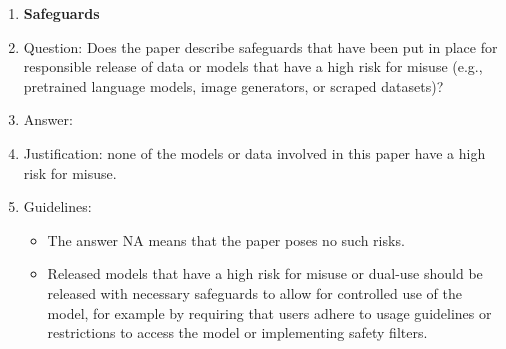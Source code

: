 \documentclass{article}
\begin{document}
\begin{enumerate}
\begin{itemize}
        \item Examples of negative societal impacts include potential malicious or unintended uses (e.g., disinformation, generating fake profiles, surveillance), fairness considerations (e.g., deployment of technologies that could make decisions that unfairly impact specific groups), privacy considerations, and security considerations.
        \item The conference expects that many papers will be foundational research and not tied to particular applications, let alone deployments. However, if there is a direct path to any negative applications, the authors should point it out. For example, it is legitimate to point out that an improvement in the quality of generative models could be used to generate deepfakes for disinformation. On the other hand, it is not needed to point out that a generic algorithm for optimizing neural networks could enable people to train models that generate Deepfakes faster.
        \item The authors should consider possible harms that could arise when the technology is being used as intended and functioning correctly, harms that could arise when the technology is being used as intended but gives incorrect results, and harms following from (intentional or unintentional) misuse of the technology.
        \item If there are negative societal impacts, the authors could also discuss possible mitigation strategies (e.g., gated release of models, providing defenses in addition to attacks, mechanisms for monitoring misuse, mechanisms to monitor how a system learns from feedback over time, improving the efficiency and accessibility of ML).
    \end{itemize}
\item {\bf Safeguards}
    \item[] Question: Does the paper describe safeguards that have been put in place for responsible release of data or models that have a high risk for misuse (e.g., pretrained language models, image generators, or scraped datasets)?
    \item[] Answer: \answerNA{}
    \item[] Justification: none of the models or data involved in this paper have a high risk for misuse.
    \item[] Guidelines:
    \begin{itemize}
        \item The answer NA means that the paper poses no such risks.
        \item Released models that have a high risk for misuse or dual-use should be released with necessary safeguards to allow for controlled use of the model, for example by requiring that users adhere to usage guidelines or restrictions to access the model or implementing safety filters.

\end{itemize}
\end{enumerate}
\end{document}
